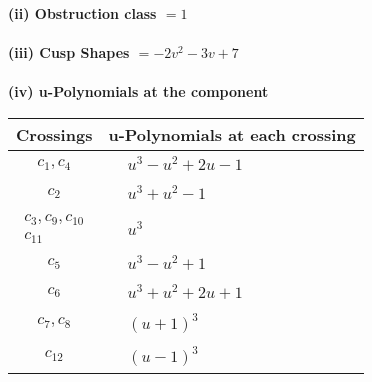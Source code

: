 \documentclass[1p]{elsarticle_modified}
\theoremstyle{definition}
\begin{document}
\flushleft \textbf{(ii) Obstruction class $= 1$}\\~\\
\flushleft \textbf{(iii) Cusp Shapes $= -2 v^2-3 v+7$}\\~\\
\newpage\renewcommand{\arraystretch}{1}
\flushleft \textbf{(iv) u-Polynomials at the component}\newline \\
\begin{tabular}{m{50pt}|m{274pt}}
Crossings & \hspace{64pt}u-Polynomials at each crossing \\
\hline $$\begin{aligned}c_{1},c_{4}\end{aligned}$$&$\begin{aligned}
&u^3- u^2+2 u-1
\end{aligned}$\\
\hline $$\begin{aligned}c_{2}\end{aligned}$$&$\begin{aligned}
&u^3+u^2-1
\end{aligned}$\\
\hline $$\begin{aligned}c_{3},c_{9},c_{10}\\c_{11}\end{aligned}$$&$\begin{aligned}
&u^3
\end{aligned}$\\
\hline $$\begin{aligned}c_{5}\end{aligned}$$&$\begin{aligned}
&u^3- u^2+1
\end{aligned}$\\
\hline $$\begin{aligned}c_{6}\end{aligned}$$&$\begin{aligned}
&u^3+u^2+2 u+1
\end{aligned}$\\
\hline $$\begin{aligned}c_{7},c_{8}\end{aligned}$$&$\begin{aligned}
&(u+1)^3
\end{aligned}$\\
\hline $$\begin{aligned}c_{12}\end{aligned}$$&$\begin{aligned}
&(u-1)^3
\end{aligned}$\\
\hline
\end{tabular}\\~\\
\end{document}
